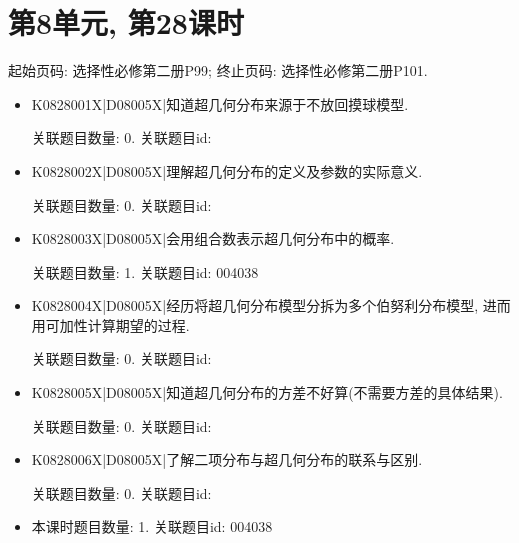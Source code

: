 \section*{第8单元, 第28课时}
起始页码: 选择性必修第二册P99; 终止页码: 选择性必修第二册P101.
\begin{itemize}
\item K0828001X|D08005X|知道超几何分布来源于不放回摸球模型.

关联题目数量: 0. 关联题目id: 

\item K0828002X|D08005X|理解超几何分布的定义及参数的实际意义.

关联题目数量: 0. 关联题目id: 

\item K0828003X|D08005X|会用组合数表示超几何分布中的概率.

关联题目数量: 1. 关联题目id: 004038

\item K0828004X|D08005X|经历将超几何分布模型分拆为多个伯努利分布模型, 进而用可加性计算期望的过程.

关联题目数量: 0. 关联题目id: 

\item K0828005X|D08005X|知道超几何分布的方差不好算(不需要方差的具体结果).

关联题目数量: 0. 关联题目id: 

\item K0828006X|D08005X|了解二项分布与超几何分布的联系与区别.

关联题目数量: 0. 关联题目id: 

\item 本课时题目数量: 1. 关联题目id: 004038

\end{itemize}

